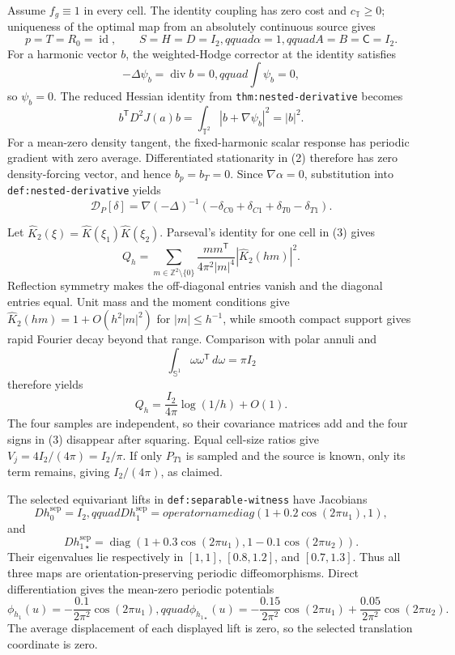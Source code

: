 Assume \(f_g\equiv1\) in every cell.  The identity coupling has zero cost and \(c_{\mathbb T}\geq0\); uniqueness of the optimal map from an absolutely continuous source gives
\[
 p=T=R_0=\operatorname{id},\qquad
 S=H=D=I_2,qquad \alpha=1,qquad A=B=\mathsf C=I_2.                  \tag{1}
\]
For a harmonic vector \(b\), the weighted-Hodge corrector at the identity satisfies
\[
 -\Delta\psi_b=\operatorname{div}b=0,qquad \int\psi_b=0,
\]
so \(\psi_b=0\).  The reduced Hessian identity from \texttt{thm:nested-derivative} becomes
\[
 b^{\mathsf T}D^2J(a)b=\int_{\mathbb T^2}|b+\nabla\psi_b|^2=|b|^2.   \tag{2}
\]
For a mean-zero density tangent, the fixed-harmonic scalar response has periodic gradient with zero average.  Differentiated stationarity in (2) therefore has zero density-forcing vector, and hence \(b_p=b_T=0\).  Since \(\nabla\alpha=0\), substitution into \texttt{def:nested-derivative} yields
\[
 \mathcal D_P[\delta]
 =\nabla(-\Delta)^{-1}
 (-\delta_{C0}+\delta_{C1}+\delta_{T0}-\delta_{T1}).                  \tag{3}
\]

Let \(\widehat K_2(\xi)=\widehat K(\xi_1)\widehat K(\xi_2)\).  Parseval's identity for one cell in (3) gives
\[
 Q_h=\sum_{m\in\mathbb Z^2\setminus\{0\}}
 \frac{mm^{\mathsf T}}{4\pi^2|m|^4}|\widehat K_2(hm)|^2.             \tag{4}
\]
Reflection symmetry makes the off-diagonal entries vanish and the diagonal entries equal.  Unit mass and the moment conditions give
\(\widehat K_2(hm)=1+O(h^2|m|^2)\) for \(|m|\leq h^{-1}\), while smooth compact support gives rapid Fourier decay beyond that range.  Comparison with polar annuli and
\[
 \int_{\mathbb S^1}\omega\omega^{\mathsf T}\,d\omega=\pi I_2
\]
therefore yields
\[
 Q_h=\frac{I_2}{4\pi}\log(1/h)+O(1).                                 \tag{5}
\]
The four samples are independent, so their covariance matrices add and the four signs in (3) disappear after squaring.  Equal cell-size ratios give
\(V_j=4I_2/(4\pi)=I_2/\pi\).  If only \(P_{T1}\) is sampled and the source is known, only its term remains, giving \(I_2/(4\pi)\), as claimed.

The selected equivariant lifts in \texttt{def:separable-witness} have Jacobians
\[
 Dh_0^{\mathrm{sep}}=I_2,qquad
 Dh_1^{\mathrm{sep}}=operatorname{diag}(1+0.2\cos(2\pi u_1),1),       \tag{1}
\]
and
\[
 Dh_{1\star}^{\mathrm{sep}}
 =\operatorname{diag}(1+0.3\cos(2\pi u_1),
                       1-0.1\cos(2\pi u_2)).                           \tag{2}
\]
Their eigenvalues lie respectively in \([1,1]\), \([0.8,1.2]\), and \([0.7,1.3]\).  Thus all three maps are orientation-preserving periodic diffeomorphisms.  Direct differentiation gives the mean-zero periodic potentials
\[
 \phi_{h_1}(u)=-\frac{0.1}{2\pi^2}\cos(2\pi u_1),qquad
 \phi_{h_{1\star}}(u)
 =-\frac{0.15}{2\pi^2}\cos(2\pi u_1)
  +\frac{0.05}{2\pi^2}\cos(2\pi u_2).                                \tag{3}
\]
The average displacement of each displayed lift is zero, so the selected translation coordinate is zero.

